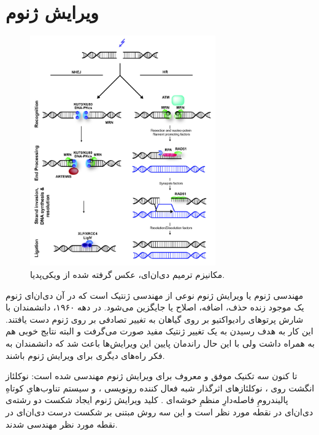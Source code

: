 \documentclass[12pt,a4paper,BCOR=.7cm,headsepline,bibliography=totoc]{report}
\begin{document}
\section{ویرایش ژنوم}
\begin{figure}
\centering
\vspace{-65pt}
\includegraphics[width=8cm, ]{pictures/DBSrepair.jpg}
\vspace{-15pt}
\caption{
مکانیزم ترمیم دی‌ان‌ای، عکس گرفته شده از ویکی‌پدیا.
}\label{wrap-fig:4}
\end{figure}
مهندسی ژنوم یا ویرایش ژنوم نوعی از مهندسی ژنتیک است که در آن دی‌ان‌ای ژنوم یک موجود زنده حذف، اضافه، اصلاح یا جایگزین می‌شود. در دهه ۱۹۶۰، دانشمندان با شارش پرتو‌های رادیواکتیو بر روی گیاهان به تغییر تصادفی   بر روی ژنوم‌ دست یافتند. این کار به هدف رسیدن به یک تغییر ژنتیک مفید صورت می‌گرفت و البته نتابج خوبی هم به همراه داشت ولی با این حال راندمان پایین این ویرایش‌ها باعث شد که دانشمندان به فکر راه‌های دیگری برای ویرایش ژنوم باشند.

تا کنون سه تکنیک موفق و معروف برای ویرایش ژنوم مهندسی شده است:
 نوکلئاز انگشت روی 
، نوکلئازهای اثرگذار شبه فعال کننده رونویسی 
، و سیستم تناوب‌هایِ کوتاهِ پالیندرومِ فاصله‌دارِ منظمِ خوشه‌ای
. 
کلید ویرایش ژنوم ایجاد شکست دو رشته‌ی دی‌ان‌ای در نقطه مورد نظر است و این سه روش مبتنی بر شکست درست دی‌ان‌ای در نقطه مورد نظر مهندسی شدند.
\end{document}
